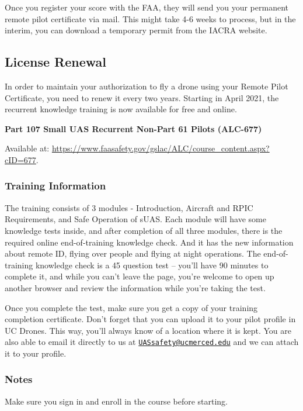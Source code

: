\documentclass[
  12pt,
]{book}
\begin{document}
Once you register your score with the FAA, they will send you your permanent remote pilot certificate via mail. This might take 4-6 weeks to process, but in the interim, you can download a temporary permit from the IACRA website.

\subsection{License Renewal}\label{license-renewal}

In order to maintain your authorization to fly a drone using your Remote Pilot Certificate, you need to renew it every two years. Starting in April 2021, the recurrent knowledge training is now available for free and online.

\textbf{Part 107 Small UAS Recurrent Non-Part 61 Pilots (ALC-677)}

Available at: \url{https://www.faasafety.gov/gslac/ALC/course_content.aspx?cID=677}.

\subsubsection{Training Information}\label{training-information}

The training consists of 3 modules - Introduction, Aircraft and RPIC Requirements, and Safe Operation of sUAS. Each module will have some knowledge tests inside, and after completion of all three modules, there is the required online end-of-training knowledge check. And it has the new information about remote ID, flying over people and flying at night operations. The end-of-training knowledge check is a 45 question test -- you'll have 90 minutes to complete it, and while you can't leave the page, you're welcome to open up another browser and review the information while you're taking the test.

Once you complete the test, make sure you get a copy of your training completion certificate. Don't forget that you can upload it to your pilot profile in UC Drones. This way, you'll always know of a location where it is kept. You are also able to email it directly to us at \href{mailto:UASsafety@ucmerced.edu}{\nolinkurl{UASsafety@ucmerced.edu}} and we can attach it to your profile.

\subsubsection{Notes}\label{notes}

Make sure you sign in and enroll in the course before starting.
\end{document}
